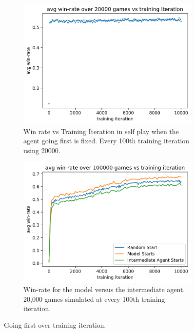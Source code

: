 \documentclass[../main.tex]{subfiles}
\begin{document}
\begin{figure}
    \centering
    \begin{subfigure}[t]{0.49\textwidth}
        \centering
        \includegraphics[width=\textwidth,keepaspectratio]{images/results/going_first_over_time.png}
        \caption{Win rate vs Training Iteration in self play when the agent going first is fixed. Every 100th training iteration using 20000.}
        \label{fig:win-rate-going-first}
    \end{subfigure}
    \hfill
    \begin{subfigure}[t]{0.49\textwidth}
        \centering
        \includegraphics[width=\textwidth,keepaspectratio]{images/results/winrate_vs_int_going_first.png}
        \caption{Win-rate for the model versus the intermediate agent. 20,000 games simulated at every 100th training iteration.}
        \label{fig:win-rate-vs-int-going-first}
    \end{subfigure}
    \caption{Going first over training iteration.}
    \label{fig:going-first-over-time}
\end{figure}
\end{document}
